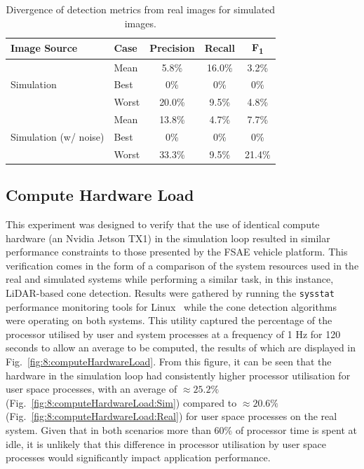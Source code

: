 \begin{table}[H] %
	\centering
	\caption{Divergence of detection metrics from real images for simulated images.}
	\label{tbl:8:visionConeDetectionRateDivergence}
	\begin{tabular}{llccc}
		\toprule
		Image Source                           & Case  & \multicolumn{1}{c}{Precision} & Recall & F\textsubscript{1} \\ \midrule
		\multirow{3}{*}{Simulation}            & Mean  &             5.8\%             & 16.0\% &       3.2\%        \\
		                                       & Best  &              0\%              &  0\%   &        0\%         \\
		                                       & Worst &            20.0\%             & 9.5\%  &       4.8\%        \\ \midrule
		\multirow{3}{*}{Simulation (w/ noise)} & Mean  &            13.8\%             & 4.7\%  &       7.7\%        \\
		                                       & Best  &              0\%              &  0\%   &        0\%         \\
		                                       & Worst &            33.3\%             & 9.5\%  &       21.4\%       \\ \bottomrule
	\end{tabular}
\end{table}

\subsection{Compute Hardware Load} \label{subsec:8:computeHardwareLoad}
This experiment was designed to verify that the use of identical compute hardware (an Nvidia Jetson TX1) in the simulation loop resulted in similar performance constraints to those presented by the FSAE vehicle platform.
This verification comes in the form of a comparison of the system resources used in the real and simulated systems while performing a similar task, in this instance, LiDAR-based cone detection.
Results were gathered by running the \texttt{sysstat} performance monitoring tools for Linux~\cite{sebastien_performance_2019} while the cone detection algorithms were operating on both systems.
This utility captured the percentage of the processor utilised by user and system processes at a frequency of 1 Hz for 120 seconds to allow an average to be computed, the results of which are displayed in Fig.~\ref{fig:8:computeHardwareLoad}.
From this figure, it can be seen that the hardware in the simulation loop had consistently higher processor utilisation for user space processes, with an average of $\approx 25.2\%$ (Fig.~\ref{fig:8:computeHardwareLoad:Sim}) compared to $\approx 20.6\%$ (Fig.~\ref{fig:8:computeHardwareLoad:Real}) for user space processes on the real system.
Given that in both scenarios more than 60\% of processor time is spent at idle, it is unlikely that this difference in processor utilisation by user space processes would significantly impact application performance.

